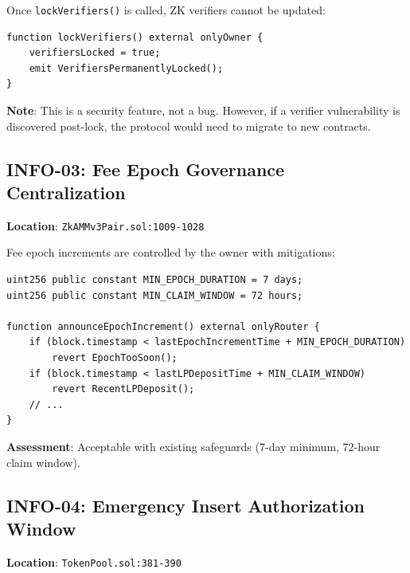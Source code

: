 \documentclass[12pt,a4paper]{article}
\begin{document}
Once \texttt{lockVerifiers()} is called, ZK verifiers cannot be updated:

\begin{lstlisting}[language=Solidity]
function lockVerifiers() external onlyOwner {
    verifiersLocked = true;
    emit VerifiersPermanentlyLocked();
}
\end{lstlisting}

\textbf{Note}: This is a security feature, not a bug. However, if a verifier vulnerability is discovered post-lock, the protocol would need to migrate to new contracts.

\subsection{INFO-03: Fee Epoch Governance Centralization}

\begin{tcolorbox}[colback=blue!10, colframe=blue!80!black, title=Informational]
\textbf{Location}: \texttt{ZkAMMv3Pair.sol:1009-1028}
\end{tcolorbox}

Fee epoch increments are controlled by the owner with mitigations:

\begin{lstlisting}[language=Solidity]
uint256 public constant MIN_EPOCH_DURATION = 7 days;
uint256 public constant MIN_CLAIM_WINDOW = 72 hours;

function announceEpochIncrement() external onlyRouter {
    if (block.timestamp < lastEpochIncrementTime + MIN_EPOCH_DURATION)
        revert EpochTooSoon();
    if (block.timestamp < lastLPDepositTime + MIN_CLAIM_WINDOW)
        revert RecentLPDeposit();
    // ...
}
\end{lstlisting}

\textbf{Assessment}: Acceptable with existing safeguards (7-day minimum, 72-hour claim window).

\subsection{INFO-04: Emergency Insert Authorization Window}

\begin{tcolorbox}[colback=blue!10, colframe=blue!80!black, title=Informational]
\textbf{Location}: \texttt{TokenPool.sol:381-390}
\end{tcolorbox}
\end{document}
